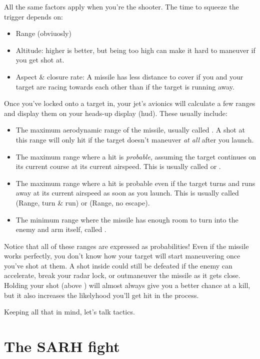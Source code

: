 All the same factors apply when you're the shooter.
The time to squeeze the trigger depends on:
\begin{itemize}
\item Range (obviuosly)
\item Altitude: higher is better, but being too high can make it hard to
    maneuver if you get shot at.
\item Aspect \& closure rate:
    A missile has less distance to cover if you and your target are racing
    towards each other than if the target is running away.
\end{itemize}
Once you've locked onto a target in,
your jet's avionics will calculate a few ranges and display them on your
heads-up display \ac{(hud)}.
These usually include:
\begin{itemize}
\item The maximum aerodynamic range of the missile, usually called
    .
    A shot at this range will only hit if the target doesn't maneuver
    \emph{at all} after you launch.
\item The maximum range where a hit is \emph{probable},
    assuming the target continues on its current course at its current airspeed.
    This is usually called  or .
\item The maximum range where a hit is probable
    even if the target turns and runs away at its current airspeed
    as soon as you launch.
    This is usually called  (Range, turn \& run)
    or  (Range, no escape).
\item The minimum range where the missile has enough room to turn into the
    enemy and arm itself, called .
\end{itemize}
Notice that all of these ranges are expressed as probabilities!
Even if the missile works perfectly,
you don't know how your target will start maneuvering once you've shot at them.
A shot inside  could still be defeated if the enemy can accelerate,
break your radar lock, or outmaneuver the missile as it gets close.
Holding your shot (above ) will almost always give you
a better chance at a kill,
but it also increases the likelyhood you'll get hit in the process.

Keeping all that in mind, let's talk tactics.

\section{The SARH fight}

